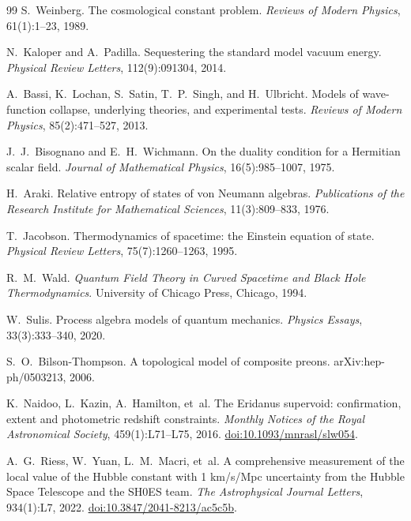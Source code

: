 \documentclass[11pt,a4paper]{article}
\theoremstyle{plain}
\theoremstyle{definition}
\theoremstyle{remark}
\begin{document}
\begin{thebibliography}{99}
S.~Weinberg.
\newblock The cosmological constant problem.
\newblock \textit{Reviews of Modern Physics}, 61(1):1--23, 1989.

N.~Kaloper and A.~Padilla.
\newblock Sequestering the standard model vacuum energy.
\newblock \textit{Physical Review Letters}, 112(9):091304, 2014.

A.~Bassi, K.~Lochan, S.~Satin, T.~P.~Singh, and H.~Ulbricht.
\newblock Models of wave-function collapse, underlying theories, and
  experimental tests.
\newblock \textit{Reviews of Modern Physics}, 85(2):471--527, 2013.

J.~J.~Bisognano and E.~H.~Wichmann.
\newblock On the duality condition for a Hermitian scalar field.
\newblock \textit{Journal of Mathematical Physics}, 16(5):985--1007, 1975.

H.~Araki.
\newblock Relative entropy of states of von {Neumann} algebras.
\newblock \textit{Publications of the Research Institute for Mathematical
  Sciences}, 11(3):809--833, 1976.

T.~Jacobson.
\newblock Thermodynamics of spacetime: the {Einstein} equation of state.
\newblock \textit{Physical Review Letters}, 75(7):1260--1263, 1995.

R.~M.~Wald.
\newblock \textit{Quantum Field Theory in Curved Spacetime and Black Hole
  Thermodynamics}.
\newblock University of Chicago Press, Chicago, 1994.

W.~Sulis.
\newblock Process algebra models of quantum mechanics.
\newblock \textit{Physics Essays}, 33(3):333--340, 2020.

S.~O.~Bilson-Thompson.
\newblock A topological model of composite preons.
\newblock arXiv:hep-ph/0503213, 2006.

K.~Naidoo, L.~Kazin, A.~Hamilton, et~al.
\newblock The Eridanus supervoid: confirmation, extent and photometric redshift
  constraints.
\newblock \emph{Monthly Notices of the Royal Astronomical Society},
  459(1):L71--L75, 2016.
\newblock \href{https://doi.org/10.1093/mnrasl/slw054}{doi:10.1093/mnrasl/slw054}.

A.~G.~Riess, W.~Yuan, L.~M.~Macri, et~al.
\newblock A comprehensive measurement of the local value of the Hubble constant
  with 1 km/s/Mpc uncertainty from the Hubble Space Telescope and the
  {SH0ES} team.
\newblock \emph{The Astrophysical Journal Letters}, 934(1):L7, 2022.
\newblock \href{https://doi.org/10.3847/2041-8213/ac5c5b}{doi:10.3847/2041-8213/ac5c5b}.


\end{thebibliography}
\end{document}

